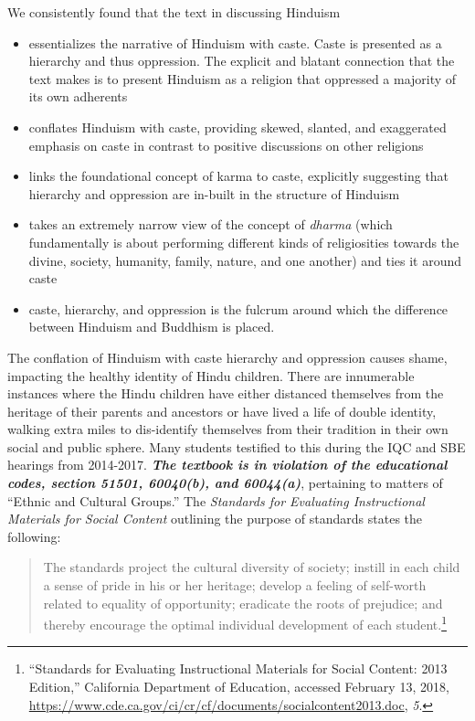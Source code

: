 We consistently found that the text in discussing Hinduism
\begin{itemize} 
\item essentializes the narrative of Hinduism with caste. Caste is presented as a hierarchy and thus oppression. The explicit and blatant connection that the text makes is to present Hinduism as a religion that oppressed a majority of its own adherents 
\item conflates Hinduism with caste, providing skewed, slanted, and exaggerated emphasis on caste in contrast to positive discussions on other religions
\item links the foundational concept of karma to caste, explicitly suggesting that hierarchy and oppression are in-built in the structure of Hinduism
\item takes an extremely narrow view of the concept of \textit{dharma} (which fundamentally is about performing different kinds of religiosities towards the divine, society, humanity, family, nature, and one another) and ties it around caste
\item caste, hierarchy, and oppression is the fulcrum around which the difference between Hinduism and Buddhism is placed. 
\end{itemize}
The conflation of Hinduism with caste hierarchy and oppression causes shame, impacting the healthy identity of Hindu children. There are innumerable instances where the Hindu children have either distanced themselves from the heritage of their parents and ancestors or have lived a life of double identity, walking extra miles to dis-identify themselves from their tradition in their own social and public sphere. Many students testified to this during the IQC and SBE hearings from 2014-2017. \textit{\textbf{The textbook is in violation of the educational codes, section 51501, 60040(b), and 60044(a)}}, pertaining to matters of “Ethnic and Cultural Groups.” The \textit{Standards for Evaluating Instructional Materials for Social Content} outlining the purpose of standards states the following: 
\begin{quote}
The standards project the cultural diversity of society; instill in each child a sense of pride in his or her heritage; develop a feeling of self-worth related to equality of opportunity; eradicate the roots of prejudice; and thereby encourage the optimal individual development of each student.\footnote{“Standards for Evaluating Instructional Materials for Social Content: 2013 Edition,” California Department of Education, accessed February 13, 2018, \url{https://www.cde.ca.gov/ci/cr/cf/documents/socialcontent2013.doc}, \textit{5}.}
\end{quote}

